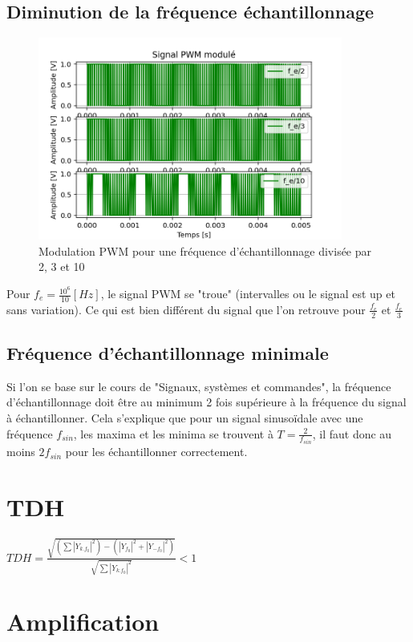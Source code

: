 \documentclass[a4paper,12pt,oneside]{report}	%
\begin{document}
        \subsection{Diminution de la fréquence échantillonnage}
            \begin{figure}[h!]
                \centering
                \includegraphics[width=10cm]{images/1.1.5 - PWM btw sin and tri.png}
                \caption{Modulation PWM pour une fréquence d’échantillonnage divisée par 2, 3 et 10}
                \label{fig:comp_freq_echant}
            \end{figure}
            Pour $f_e = \frac{10^6}{10} [Hz]$, le signal PWM se "troue" (intervalles ou le signal est up et sans variation). Ce qui est bien différent du signal que l'on retrouve pour $\frac{f_e}{2}$ et $\frac{f_e}{3}$
        \subsection{Fréquence d’échantillonnage minimale}
            Si l'on se base sur le cours de "Signaux, systèmes et commandes", la fréquence d’échantillonnage doit être au minimum 2 fois supérieure à la fréquence du signal à échantillonner. Cela s'explique que pour un signal sinusoïdale avec une fréquence $f_{sin}$, les maxima et les minima se trouvent à $T = \frac{2}{f_{sin}}$, il faut donc au moins $2f_{sin}$ pour les échantillonner correctement. 
    \section{TDH}
        $TDH = \frac{\sqrt{(\sum |Y_{k.f_0}|^2)-(|Y_{f_0}|^2+|Y_{-f_0}|^2)}}{\sqrt{\sum|Y_{k.f_0}|^2}}<1$
\newpage
    \section{Amplification}
\end{document}
